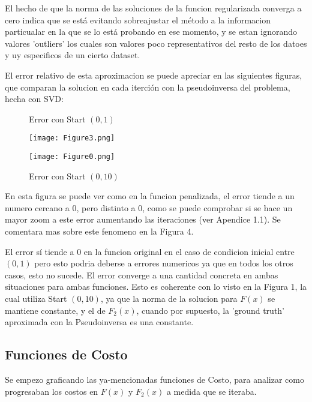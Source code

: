 \documentclass{article}
\begin{document}
\noindent El hecho de que la norma de las soluciones de la funcion regularizada converga a cero indica que se está evitando sobreajustar el método a la informacion particualar en la que se lo está probando en ese momento, y se estan ignorando valores 'outliers' los cuales son valores poco representativos del resto de los datoes y uy especificos de un cierto dataset.\vspace{\baselineskip}

\noindent El error relativo de esta aproximacion se puede apreciar en las siguientes figuras, que comparan la solucion en cada iterción con la pseudoinversa del problema, hecha con SVD:


\begin{figure}[H]
    \centering
    \begin{minipage}{.5\textwidth}
        \centering
        \caption{Error con Start $(0, 1)$}
        \label{fig:Image1.3}
        \texttt{[image: Figure3.png]}
    \end{minipage}%
    \begin{minipage}{.5\textwidth}
        \centering
        \caption{Error con Start $(0, 10)$}
        \label{fig:Image1.4}
        \texttt{[image: Figure0.png]}
    \end{minipage}
\end{figure}

\noindent En esta figura se puede ver como en la funcion penalizada, el error tiende a un numero cercano a $0$, pero distinto a $0$, como se puede comprobar si se hace un mayor zoom a este error aumentando las iteraciones (ver Apendice 1.1). Se comentara mas sobre este fenomeno en la Figura 4. \vspace{\baselineskip}

\noindent El error sí tiende a $0$ en la funcion original en el caso de condicion inicial entre $(0, 1)$ pero esto podria deberse a errores numericos ya que en todos los otros casos, esto no sucede. El error converge a una cantidad concreta en ambas situaciones para ambas funciones. Esto es coherente con lo visto en la Figura 1, la cual utiliza Start $(0, 10)$, ya que la norma de la solucion para $F(x)$ se mantiene constante, y el de $F_2(x)$, cuando por supuesto, la 'ground truth' aproximada con la Pseudoinversa es una constante.
\subsection*{Funciones de Costo}

\noindent Se empezo graficando las ya-mencionadas funciones de Costo, para analizar como progresaban los costos en $F(x)$ y $F_2(x)$ a medida que se iteraba.
\end{document}
